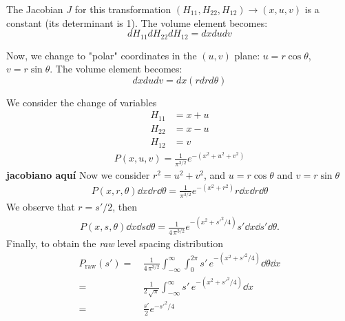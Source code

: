 \documentclass[10pt]{article}
\begin{document}
The Jacobian $J$ for this transformation $(H_{11}, H_{22}, H_{12}) \rightarrow (x, u, v)$ is a constant (its determinant is 1). The volume element becomes:
$$ dH_{11}  dH_{22}  dH_{12} = dx  du  dv $$

Now, we change to "polar" coordinates in the $(u, v)$ plane: $u = r \cos\theta$, $v = r \sin\theta$. The volume element becomes:
$$ dx  du  dv = dx  (r  dr  d\theta) $$


We consider the change of variables
$$ \begin{aligned}
H_{11} &= x + u \\
H_{22} &= x - u \\
H_{12} &= v
\end{aligned} $$
\begin{align}
P(x, u, v) 
= 
\frac{1}{\pi^{3/2}}
e^{-(x^2 + u^2 + v^2)}
\end{align}
\textbf{jacobiano aquí}
Now we consider $r^2 = u^2 + v^2$, and $u = r\cos \theta$ and 
$v = r\sin \theta$
\begin{align}
P(x, r, \theta)\dd{x}\dd{r}\dd{\theta}
= 
\frac{1}{\pi^{3/2}}
e^{- (x^2 + r^2)}
r \dd{x}\dd{r}\dd{\theta}
\end{align}
We observe that $r = s'/2$, then
\begin{align}
P(x, s, \theta)\dd{x}\dd{s}\dd{\theta}
= 
\frac{1}{4\,\pi^{3/2}}
e^{-(x^2 + s'^2/4)}
s' \dd{x}\dd{s'}\dd{\theta}.
\end{align}
Finally, to obtain the \textit{raw} level spacing distribution
\begin{align}
P_{\mathrm{raw}}(s')
=\,&
\frac{1}{4\,\pi^{3/2}}
\int_{-\infty}^\infty
\int_0^{2\pi}
s'\,e^{-(x^2 + s'^2/4)}
\dd{\theta} \dd{x} 
\\
=\,&
\frac{1}{2\,\sqrt{\pi}}
\int_{-\infty}^\infty
s'\,e^{-(x^2 + s'^2/4)}
\dd{x}
\\
=\,&
\frac{s'}{2}e^{-s'^2/4}
\end{align}
\end{document}
